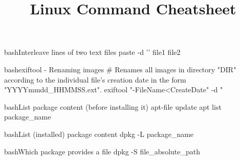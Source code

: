 \documentclass[10pt,a4paper]{article}
\title{\color{w3schools}Linux Command Cheatsheet
}
\begin{document}
\maketitle
\small
\begin{multicols}{3}

\thispagestyle{empty}
\scriptsize

% 




\begin{codebox}{bash}{Interleave lines of two text files}
paste -d '\n' file1 file2

\end{codebox}

\begin{codebox}{bash}{exiftool - Renaming images}
# Renames all images in directory "DIR" according to the individual file's creation date in the form "YYYYmmdd\_HHMMSS.ext".
exiftool "-FileName<CreateDate"
     -d "%

\end{codebox}

\begin{codebox}{bash}{List package content (before installing it)}
apt-file update
apt list package_name

\end{codebox}

\begin{codebox}{bash}{List (installed) package content}
dpkg -L package_name

\end{codebox}

\begin{codebox}{bash}{Which package provides a file}
dpkg -S file_absolute_path

\end{codebox}


\end{multicols}
\end{document}

